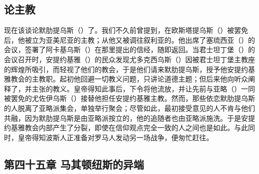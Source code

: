 \subsection{论主教}

现在该谈论默肋提乌斯（）了。我们不久前曾提到，在欧斯塔提乌斯（）被罢免后，他被立为亚美尼亚的主教；从他又被调往叙利亚的。他出席了塞琉西亚（）的会议，签署了阿卡基乌斯（）在那里提出的信经，随即返回。当君士坦丁堡（）的会议召开时，安提约基雅（）的民众发现尤多克西乌斯（）因被君士坦丁堡主教座的辉煌所吸引，而轻视了他们的教会，于是他们请来默肋提乌斯，授予他安提约基雅教会的主教职。起初他回避一切教义问题，只讲论道德主题；但后来他向听众阐释了，并主张的教义。皇帝得知此事后，下令将他流放，并让先前与亚略（）一同被罢免的尤佐伊乌斯（）接替他担任安提约基雅主教。然而，那些依恋默肋提乌斯的人脱离了亚略派集会，单独举行聚会；尽管如此，最初接受意见的人不肯与他们共融，因为默肋提乌斯是由亚略派按立的，他的追随者也由亚略派施洗。于是安提约基雅教会内部产生了分裂，即使在信仰观点完全一致的人之间也是如此。与此同时，皇帝得知波斯人正准备对罗马人发动另一场战争，便匆忙赶往。\par


\subsection{第四十五章 马其顿纽斯的异端}

